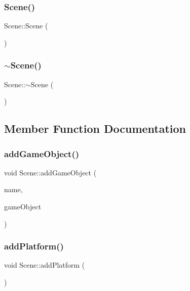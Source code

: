 \subsubsection{\texorpdfstring{Scene()}{Scene()}}
{\footnotesize\ttfamily Scene\+::\+Scene (\begin{DoxyParamCaption}{ }\end{DoxyParamCaption})}

\mbox{\label{class_scene_a3b8cec2e32546713915f8c6303c951f1}} 
\subsubsection{\texorpdfstring{$\sim$\+Scene()}{~Scene()}}
{\footnotesize\ttfamily Scene\+::$\sim$\+Scene (\begin{DoxyParamCaption}{ }\end{DoxyParamCaption})\hspace{0.3cm}{\ttfamily [inline]}}



\subsection{Member Function Documentation}
\mbox{\label{class_scene_a3aeff0df4ebdc17207c48a76ed3ccfa6}} 
\subsubsection{\texorpdfstring{add\+Game\+Object()}{addGameObject()}}
{\footnotesize\ttfamily void Scene\+::add\+Game\+Object (\begin{DoxyParamCaption}\item[{string}]{name,  }\item[{shared\+\_\+ptr$<$ \mbox{\hyperlink{class_game_object}{Game\+Object}} $>$ \&}]{game\+Object }\end{DoxyParamCaption})}

\mbox{\label{class_scene_ac3864628aa57cecf65809bfdd00e4b6d}} 
\subsubsection{\texorpdfstring{add\+Platform()}{addPlatform()}}
{\footnotesize\ttfamily void Scene\+::add\+Platform (\begin{DoxyParamCaption}{ }\end{DoxyParamCaption})\hspace{0.3cm}{\ttfamily [inline]}}

